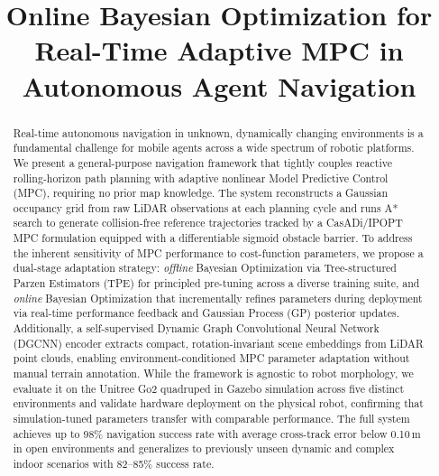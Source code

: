 \documentclass[conference]{IEEEtran}
\begin{document}
\title{Online Bayesian Optimization for Real-Time Adaptive MPC in Autonomous Agent Navigation}

\author{
}

\maketitle

\begin{abstract}
	Real-time autonomous navigation in unknown, dynamically changing environments is a fundamental challenge for mobile agents across a wide spectrum of robotic platforms. We present a general-purpose navigation framework that tightly couples reactive rolling-horizon path planning with adaptive nonlinear Model Predictive Control (MPC), requiring no prior map knowledge. The system reconstructs a Gaussian occupancy grid from raw LiDAR observations at each planning cycle and runs A* search to generate collision-free reference trajectories tracked by a CasADi/IPOPT MPC formulation equipped with a differentiable sigmoid obstacle barrier. To address the inherent sensitivity of MPC performance to cost-function parameters, we propose a dual-stage adaptation strategy: \emph{offline} Bayesian Optimization via Tree-structured Parzen Estimators (TPE) for principled pre-tuning across a diverse training suite, and \emph{online} Bayesian Optimization that incrementally refines parameters during deployment via real-time performance feedback and Gaussian Process (GP) posterior updates. Additionally, a self-supervised Dynamic Graph Convolutional Neural Network (DGCNN) encoder extracts compact, rotation-invariant scene embeddings from LiDAR point clouds, enabling environment-conditioned MPC parameter adaptation without manual terrain annotation. While the framework is agnostic to robot morphology, we evaluate it on the Unitree Go2 quadruped in Gazebo simulation across five distinct environments and validate hardware deployment on the physical robot, confirming that simulation-tuned parameters transfer with comparable performance. The full system achieves up to 98\% navigation success rate with average cross-track error below 0.10\,m in open environments and generalizes to previously unseen dynamic and complex indoor scenarios with 82--85\% success rate.
\end{abstract}
\end{document}

